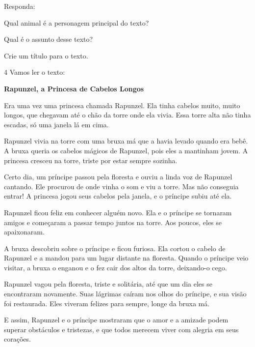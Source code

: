 Responda:

\begin{escolha}
\item Qual animal é a personagem principal do texto?


\item Qual é o assunto desse texto?


\item Crie um título para o texto.


\end{escolha}

\num{4} Vamos ler o texto:


\begin{myquote}
\textbf{Rapunzel, a Princesa de Cabelos Longos}

Era uma vez uma princesa chamada Rapunzel. Ela tinha cabelos muito, muito longos, que chegavam até o chão da torre onde ela vivia. Essa torre alta não tinha escadas, só uma janela lá em cima.

Rapunzel vivia na torre com uma bruxa má que a havia levado quando era bebê. A bruxa queria os cabelos mágicos de Rapunzel, pois eles a mantinham jovem. A princesa cresceu na torre, triste por estar sempre sozinha.

Certo dia, um príncipe passou pela floresta e ouviu a linda voz de Rapunzel cantando. Ele procurou de onde vinha o som e viu a torre. Mas não conseguia entrar! A princesa jogou seus cabelos pela janela, e o príncipe subiu até ela.

Rapunzel ficou feliz em conhecer alguém novo. Ela e o príncipe se tornaram amigos e começaram a passar tempo juntos na torre. Aos poucos, eles se apaixonaram.

A bruxa descobriu sobre o príncipe e ficou furiosa. Ela cortou o cabelo de Rapunzel e a mandou para um lugar distante na floresta. Quando o príncipe veio visitar, a bruxa o enganou e o fez cair dos altos da torre, deixando-o cego.

Rapunzel vagou pela floresta, triste e solitária, até que um dia eles se encontraram novamente. Suas lágrimas caíram nos olhos do príncipe, e sua visão foi restaurada. Eles viveram felizes para sempre, longe da bruxa má.

E assim, Rapunzel e o príncipe mostraram que o amor e a amizade podem superar obstáculos e tristezas, e que todos merecem viver com alegria em seus corações.
\end{myquote}

